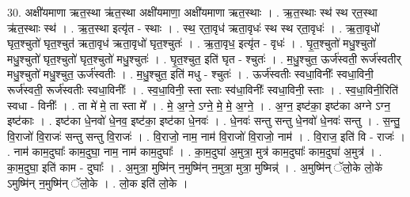 \documentclass[17pt]{extarticle}
\begin{document}
30. अक्षी॑यमाणा ऋत॒स्था ऋ॑त॒स्था अक्षी॑यमाणा॒ अक्षी॑यमाणा ऋत॒स्थाः । . ऋ॒त॒स्थाः स्थ॑ स्थ र्‌त॒स्था ऋ॑त॒स्थाः स्थ॑ । . ऋ॒त॒स्था इत्यृ॑त - स्थाः । . स्थ॒ र्‌ता॒वृध॑ ऋता॒वृधः॑ स्थ स्थ र्‌ता॒वृधः॑ । . ऋ॒ता॒वृधो॑ घृत॒श्चुतो॑ घृत॒श्चुत॑ ऋता॒वृध॑ ऋता॒वृधो॑ घृत॒श्चुतः॑ । . ऋ॒ता॒वृध॒ इत्यृ॑त - वृधः॑ । . घृ॒त॒श्चुतो॑ मधु॒श्चुतो॑ मधु॒श्चुतो॑ घृत॒श्चुतो॑ घृत॒श्चुतो॑ मधु॒श्चुतः॑ । . घृ॒त॒श्चुत॒ इति॑ घृत - श्चुतः॑ । . म॒धु॒श्चुत॒ ऊर्ज॑स्वती॒ रूर्ज॑स्वतीर् मधु॒श्चुतो॑ मधु॒श्चुत॒ ऊर्ज॑स्वतीः । . म॒धु॒श्चुत॒ इति॑ मधु - श्चुतः॑ । . ऊर्ज॑स्वतीः स्वधा॒विनीः᳚ स्वधा॒विनी॒ रूर्ज॑स्वती॒ रूर्ज॑स्वतीः स्वधा॒विनीः᳚ । . स्व॒धा॒विनी॒ स्ता स्ताः स्व॑धा॒विनीः᳚ स्वधा॒विनी॒ स्ताः । . स्व॒धा॒विनी॒रिति॑ स्वधा - विनीः᳚ । . ता मे॑ मे॒ ता स्ता मे᳚ । . मे॒ अ॒ग्ने॒ ऽग्ने॒ मे॒ मे॒ अ॒ग्ने॒ । . अ॒ग्न॒ इष्ट॑का॒ इष्ट॑का अग्ने ऽग्न॒ इष्ट॑काः । . इष्ट॑का धे॒नवो॑ धे॒नव॒ इष्ट॑का॒ इष्ट॑का धे॒नवः॑ । . धे॒नवः॑ सन्तु सन्तु धे॒नवो॑ धे॒नवः॑ सन्तु । . स॒न्तु॒ वि॒राजो॑ वि॒राजः॑ सन्तु सन्तु वि॒राजः॑ । . वि॒राजो॒ नाम॒ नाम॑ वि॒राजो॑ वि॒राजो॒ नाम॑ । . वि॒राज॒ इति॑ वि - राजः॑ । . नाम॑ काम॒दुघाः᳚ काम॒दुघा॒ नाम॒ नाम॑ काम॒दुघाः᳚ । . का॒म॒दुघा॑ अ॒मुत्रा॒ मुत्र॑ काम॒दुघाः᳚ काम॒दुघा॑ अ॒मुत्र॑ । . का॒म॒दुघा॒ इति॑ काम - दुघाः᳚ । . अ॒मुत्रा॒ मुष्मि॑न् न॒मुष्मि॑न् न॒मुत्रा॒ मुत्रा॒ मुष्मिन्न्॑ । . अ॒मुष्मि॑न् ॅलो॒के लो॒के॑ ऽमुष्मि॑न् न॒मुष्मि॑न् ॅलो॒के । . लो॒क इति॑ लो॒के । \newline
\end{document}
